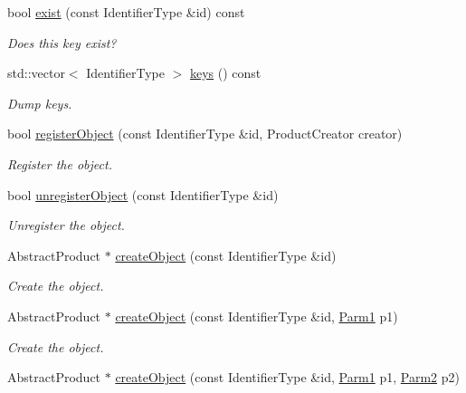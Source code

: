 \begin{DoxyCompactItemize}
\item 
bool \mbox{\hyperlink{classUtil_1_1ObjectFactory_acb89fb305fe8ed1a52fa92d1f463d449}{exist}} (const Identifier\+Type \&id) const
\begin{DoxyCompactList}\small\item\em Does this key exist? \end{DoxyCompactList}\item 
std\+::vector$<$ Identifier\+Type $>$ \mbox{\hyperlink{classUtil_1_1ObjectFactory_a10d2a7a76f67d69f545b7fc69fdc71e0}{keys}} () const
\begin{DoxyCompactList}\small\item\em Dump keys. \end{DoxyCompactList}\item 
bool \mbox{\hyperlink{classUtil_1_1ObjectFactory_a2eb2f1fc927e23a1a266aa6fa8c6562a}{register\+Object}} (const Identifier\+Type \&id, Product\+Creator creator)
\begin{DoxyCompactList}\small\item\em Register the object. \end{DoxyCompactList}\item 
bool \mbox{\hyperlink{classUtil_1_1ObjectFactory_afec1cc774d14a18875e6176695daa422}{unregister\+Object}} (const Identifier\+Type \&id)
\begin{DoxyCompactList}\small\item\em Unregister the object. \end{DoxyCompactList}\item 
Abstract\+Product $\ast$ \mbox{\hyperlink{classUtil_1_1ObjectFactory_acda1e4c447acbb9666db46d230b1a5a1}{create\+Object}} (const Identifier\+Type \&id)
\begin{DoxyCompactList}\small\item\em Create the object. \end{DoxyCompactList}\item 
Abstract\+Product $\ast$ \mbox{\hyperlink{classUtil_1_1ObjectFactory_a0b22cb87ce4398b9529814cc0ede49e6}{create\+Object}} (const Identifier\+Type \&id, \mbox{\hyperlink{classUtil_1_1ObjectFactory_a47e4f863537be7a4f5f5972691bb0b57}{Parm1}} p1)
\begin{DoxyCompactList}\small\item\em Create the object. \end{DoxyCompactList}\item 
Abstract\+Product $\ast$ \mbox{\hyperlink{classUtil_1_1ObjectFactory_a5a083061368895d734583729bea897c0}{create\+Object}} (const Identifier\+Type \&id, \mbox{\hyperlink{classUtil_1_1ObjectFactory_a47e4f863537be7a4f5f5972691bb0b57}{Parm1}} p1, \mbox{\hyperlink{classUtil_1_1ObjectFactory_ae438d0c17d1510e6fd7db9ac479a371f}{Parm2}} p2)

\end{DoxyCompactItemize}
